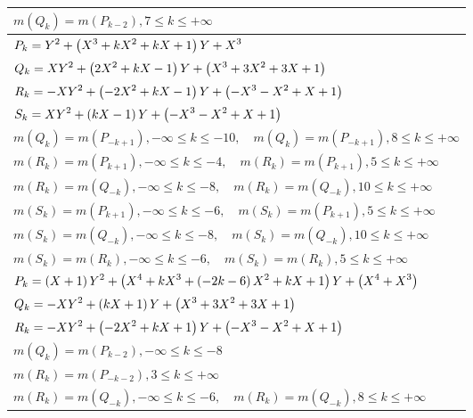 \documentclass{amsart}
\begin{document}
\begin{longtable}{|l|}
\(\displaystyle m(Q_k) = m(P_{k
 - 2}),7 \leqslant k \leqslant +\infty\)\\
\hline
\(\displaystyle P_k=Y^2
 + \left(X^3
 + k\*X^2
 + k\*X
 + 1\right) \*Y
 + X^3\)\\
\(\displaystyle Q_k=X\*Y^2
 + \left(2\*X^2
 + k\*X
 - 1\right) \*Y
 + \left(X^3
 + 3\*X^2
 + 3\*X
 + 1\right) \)\\
\(\displaystyle R_k=-X\*Y^2
 + \left(-2\*X^2
 + k\*X
 - 1\right) \*Y
 + \left(-X^3
 - X^2
 + X
 + 1\right) \)\\
\(\displaystyle S_k=X\*Y^2
 + \left(k\*X
 - 1\right) \*Y
 + \left(-X^3
 - X^2
 + X
 + 1\right) \)\\
\(\displaystyle m(Q_k) = m(P_{-k
 + 1}),-\infty \leqslant k \leqslant -10,\quad m(Q_k) = m(P_{-k
 + 1}),8 \leqslant k \leqslant +\infty\)\\
\(\displaystyle m(R_k) = m(P_{k
 + 1}),-\infty \leqslant k \leqslant -4,\quad m(R_k) = m(P_{k
 + 1}),5 \leqslant k \leqslant +\infty\)\\
\(\displaystyle m(R_k) = m(Q_{-k}),-\infty \leqslant k \leqslant -8,\quad m(R_k) = m(Q_{-k}),10 \leqslant k \leqslant +\infty\)\\
\(\displaystyle m(S_k) = m(P_{k
 + 1}),-\infty \leqslant k \leqslant -6,\quad m(S_k) = m(P_{k
 + 1}),5 \leqslant k \leqslant +\infty\)\\
\(\displaystyle m(S_k) = m(Q_{-k}),-\infty \leqslant k \leqslant -8,\quad m(S_k) = m(Q_{-k}),10 \leqslant k \leqslant +\infty\)\\
\(\displaystyle m(S_k) = m(R_{k}),-\infty \leqslant k \leqslant -6,\quad m(S_k) = m(R_{k}),5 \leqslant k \leqslant +\infty\)\\
\hline
\(\displaystyle P_k= \left(X
 + 1\right) \*Y^2
 + \left(X^4
 + k\*X^3
 + \left(-2\*k
 - 6\right) \*X^2
 + k\*X
 + 1\right) \*Y
 + \left(X^4
 + X^3\right) \)\\
\(\displaystyle Q_k=-X\*Y^2
 + \left(k\*X
 + 1\right) \*Y
 + \left(X^3
 + 3\*X^2
 + 3\*X
 + 1\right) \)\\
\(\displaystyle R_k=-X\*Y^2
 + \left(-2\*X^2
 + k\*X
 + 1\right) \*Y
 + \left(-X^3
 - X^2
 + X
 + 1\right) \)\\
\(\displaystyle m(Q_k) = m(P_{k
 - 2}),-\infty \leqslant k \leqslant -8\)\\
\(\displaystyle m(R_k) = m(P_{-k
 - 2}),3 \leqslant k \leqslant +\infty\)\\
\(\displaystyle m(R_k) = m(Q_{-k}),-\infty \leqslant k \leqslant -6,\quad m(R_k) = m(Q_{-k}),8 \leqslant k \leqslant +\infty\)\\

\end{longtable}
\end{document}

